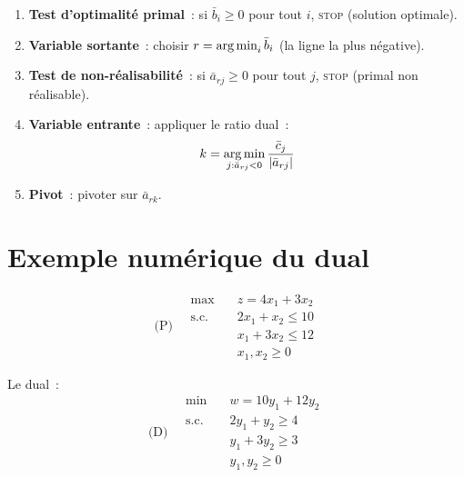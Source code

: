 \begin{algorithme}[title=\textbf{Simplexe dual -- une it\'eration}]
\begin{enumerate}
  \item \textbf{Test d'optimalit\'e primal}~: si $\bar{b}_i \ge 0$ pour
        tout $i$, \textsc{stop} (solution optimale).
  \item \textbf{Variable sortante}~: choisir $r = \operatorname*{arg\,min}_i \bar{b}_i$
        (la ligne la plus n\'egative).
  \item \textbf{Test de non-r\'ealisabilit\'e}~: si $\bar{a}_{rj} \ge 0$
        pour tout $j$, \textsc{stop} (primal non r\'ealisable).
  \item \textbf{Variable entrante}~: appliquer le ratio dual~:
        \[
          k = \operatorname*{arg\,min}_{j : \bar{a}_{rj} < 0}
            \frac{\bar{c}_j}{\left| \bar{a}_{rj} \right|}
        \]
  \item \textbf{Pivot}~: pivoter sur $\bar{a}_{rk}$.
\end{enumerate}
\end{algorithme}

\section{Exemple num\'erique du dual}

\begin{exemple}
\[
\text{(P)} \quad
\begin{aligned}
  \max \quad & z = 4x_1 + 3x_2 \\
  \text{s.c.} \quad
    & 2x_1 + x_2 \le 10 \\
    & x_1 + 3x_2 \le 12 \\
    & x_1, x_2 \ge 0
\end{aligned}
\]

Le dual~:
\[
\text{(D)} \quad
\begin{aligned}
  \min \quad & w = 10y_1 + 12y_2 \\
  \text{s.c.} \quad
    & 2y_1 + y_2 \ge 4 \\
    & y_1 + 3y_2 \ge 3 \\
    & y_1, y_2 \ge 0
\end{aligned}
\]
\end{exemple}

